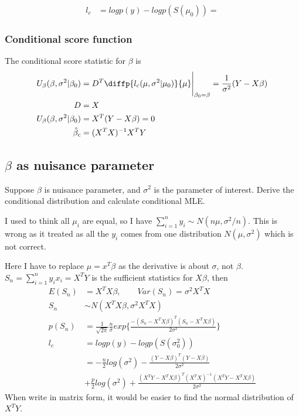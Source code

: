 \documentclass[11pt]{article} %
\begin{document}
\begin{align*}
	l_c &= log p(y) - log p(S(\mu_0)) = 
\end{align*}

\subsubsection{Conditional score function}
The conditional score statistic for $\beta$ is 
\begin{align*}
	U_{\beta}(\beta, \sigma^2| \beta_0) &= D^T \diffp{l_c(\mu, \sigma^2| \mu_0)}{\mu} \Bigg|_{\beta_0= \beta} = \frac{1}{\sigma^2} (Y-X\beta)\\
	D & = X\\
	U_{\beta}(\beta, \sigma^2 | \beta_0) &= X^T (Y- X\beta) = 0\\
	\hat{\beta}_c &= (X^T X)^{-1} X^T Y
\end{align*}

\subsection{$\beta$ as nuisance parameter}
 Suppose $\beta$ is nuisance parameter, and $\sigma^2$ is the parameter of interest. Derive the conditional distribution and calculate conditional MLE.

I used to think all $\mu_i$ are equal, so I have $\sum_{i=1}^n y_i \sim N(n\mu, \sigma^2/n)$. This is wrong as it treated as all the $y_i$ comes from one distribution $N(\mu, \sigma^2)$ which is not correct.

Here I have to replace $\mu = x^T \beta$ as the derivative is about $\sigma$, not $\beta$.  $S_n = \sum_{i=1}^n y_i x_i = X^T Y$ is the sufficient statistics for $X \beta$, then 
\begin{align*}
	E(S_n) &= X^T X \beta, \qquad Var(S_n) = \sigma^2 X^T X\\
	S_n & \sim N(X^T X \beta, \sigma^2 X^T X) \\
	p(S_n) &= \frac{1}{\sqrt{2\pi}} \frac{n}{\sigma} exp\{\frac{-(S_n - X^T X \beta)^T (S_n - X^T X \beta)}{2 \sigma^2} \} \\
	l_c &= log p(y) - log p(S(\sigma_0^2))\\
	& =-\frac{n}{2} log(\sigma^2) - \frac{(Y-X \beta)^T(Y- X \beta)}{2 \sigma^2}\\
	& + \frac{p}{2} log(\sigma^2) + \frac{(X^T Y - X^T X \beta)^T (X^T X)^{-1}(X^T Y - X^T X \beta)}{2 \sigma^2}
\end{align*}
When write in matrix form, it would be easier to find the normal distribution of $X^TY$.
\end{document}

